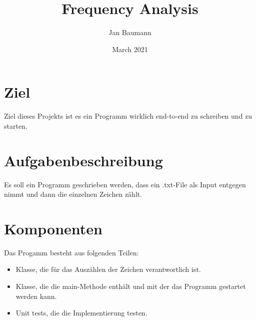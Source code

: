 \documentclass{article}
\title{Frequency Analysis}
\author{Jan Baumann }
\date{March 2021}
\begin{document}
\maketitle

\section{Ziel}
Ziel dieses Projekts ist es ein Programm wirklich end-to-end zu schreiben und zu starten.

\section{Aufgabenbeschreibung}
Es soll ein Programm geschrieben werden, dass ein .txt-File als Input entgegen nimmt und dann die einzelnen Zeichen zählt.

\section{Komponenten}
Das Progamm besteht aus folgenden Teilen:
\begin{itemize}
    \item Klasse, die für das Auszählen der Zeichen verantwortlich ist.
    \item Klasse, die die main-Methode enthält und mit der das Programm gestartet werden kann.
    \item Unit tests, die die Implementierung testen.
\end{itemize}
\end{document}
